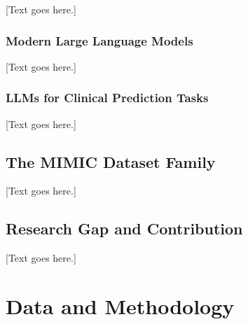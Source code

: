 \documentclass[12pt, a4paper]{article}
\begin{document}
[Text goes here.]

\subsubsection{Modern Large Language Models}

[Text goes here.]

\subsubsection{LLMs for Clinical Prediction Tasks}

[Text goes here.]

\subsection{The MIMIC Dataset Family}

[Text goes here.]

\subsection{Research Gap and Contribution}

[Text goes here.]

\section{Data and Methodology}
\end{document}
